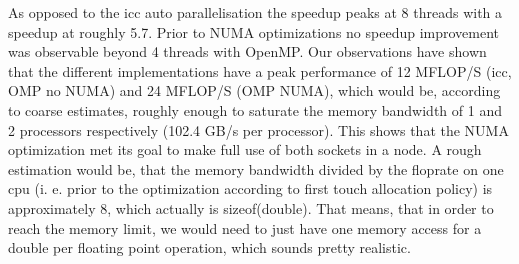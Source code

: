 As opposed to the icc auto parallelisation the speedup peaks at 8 threads with a speedup at roughly 5.7. Prior to NUMA optimizations no speedup improvement was observable beyond 4 threads with OpenMP. Our observations have shown that the different implementations have a peak performance of 12 MFLOP/S (icc, OMP no NUMA) and 24 MFLOP/S (OMP NUMA), which would be, according to coarse estimates, roughly enough to saturate the memory bandwidth of 1 and 2 processors respectively (102.4 GB/s per processor). This shows that the NUMA optimization met its goal to make full use of both sockets in a node. A rough estimation would be, that the memory bandwidth divided by the floprate on one cpu (i. e. prior to the optimization according to first touch allocation policy) is approximately 8, which actually is sizeof(double). That means, that in order to reach the memory limit, we would need to just have one memory access for a double per floating point operation, which sounds pretty realistic.

